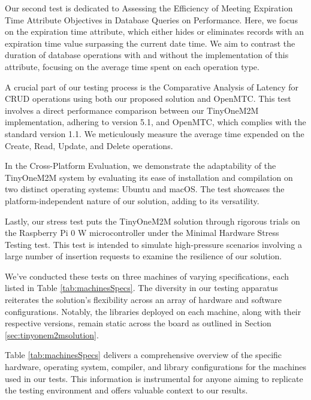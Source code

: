 \documentclass[a4paper,fleqn]{cas-dc}
\begin{document}
Our second test is dedicated to Assessing the Efficiency of Meeting Expiration Time Attribute Objectives in Database Queries on Performance. Here, we focus on the expiration time attribute, which either hides or eliminates records with an expiration time value surpassing the current date time. We aim to contrast the duration of database operations with and without the implementation of this attribute, focusing on the average time spent on each operation type.

A crucial part of our testing process is the Comparative Analysis of Latency for CRUD operations using both our proposed solution and OpenMTC. This test involves a direct performance comparison between our TinyOneM2M implementation, adhering to version 5.1, and OpenMTC, which complies with the standard version 1.1. We meticulously measure the average time expended on the Create, Read, Update, and Delete operations.

In the Cross-Platform Evaluation, we demonstrate the adaptability of the TinyOneM2M system by evaluating its ease of installation and compilation on two distinct operating systems: Ubuntu and macOS. The test showcases the platform-independent nature of our solution, adding to its versatility.

Lastly, our stress test puts the TinyOneM2M solution through rigorous trials on the Raspberry Pi 0 W microcontroller under the Minimal Hardware Stress Testing test. This test is intended to simulate high-pressure scenarios involving a large number of insertion requests to examine the resilience of our solution.

We've conducted these tests on three machines of varying specifications, each listed in Table \ref{tab:machinesSpecs}. The diversity in our testing apparatus reiterates the solution's flexibility across an array of hardware and software configurations. Notably, the libraries deployed on each machine, along with their respective versions, remain static across the board as outlined in Section \ref{sec:tinyonem2msolution}.

Table \ref{tab:machinesSpecs} delivers a comprehensive overview of the specific hardware, operating system, compiler, and library configurations for the machines used in our tests. This information is instrumental for anyone aiming to replicate the testing environment and offers valuable context to our results.
\end{document}
